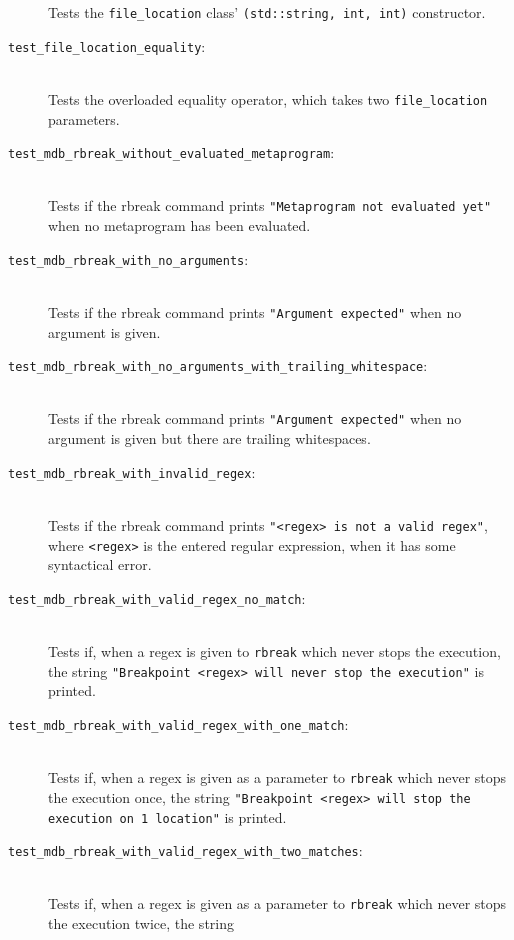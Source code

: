 \begin{description}
        Tests the \texttt{file\_location} class'
        \texttt{(std::string, int, int)} constructor.
    \item[\texttt{test\_file\_location\_equality}:] \hfill \\
        Tests the overloaded equality operator, which takes two
        \texttt{file\_location} parameters.
    \item[\texttt{test\_mdb\_rbreak\_without\_evaluated\_metaprogram}:] \hfill \\
        Tests if the rbreak command prints
        \texttt{"Metaprogram not evaluated yet"} when no metaprogram has been
        evaluated.
    \item[\texttt{test\_mdb\_rbreak\_with\_no\_arguments}:] \hfill \\
        Tests if the rbreak command prints
        \texttt{"Argument expected"} when no argument is given.
    \item[\texttt{test\_mdb\_rbreak\_with\_no\_arguments\_with\_trailing\_whitespace}:] \hfill \\
        Tests if the rbreak command prints
        \texttt{"Argument expected"} when no argument is given but there are
        trailing whitespaces.
    \item[\texttt{test\_mdb\_rbreak\_with\_invalid\_regex}:] \hfill \\
        Tests if the rbreak command prints
        \texttt{"<regex> is not a valid regex"}, where \texttt{<regex>} is the
        entered regular expression, when it has some syntactical error.
    \item[\texttt{test\_mdb\_rbreak\_with\_valid\_regex\_no\_match}:] \hfill \\
        Tests if, when a regex is given to \texttt{rbreak} which never stops
        the execution, the string
        \texttt{"Breakpoint <regex> will never stop the execution"} is
        printed.
    \item[\texttt{test\_mdb\_rbreak\_with\_valid\_regex\_with\_one\_match}:] \hfill \\
        Tests if, when a regex is given as a parameter to \texttt{rbreak} which
        never stops the execution once, the string
        \texttt{"Breakpoint <regex> will stop the execution on 1 location"} is
        printed.
    \item[\texttt{test\_mdb\_rbreak\_with\_valid\_regex\_with\_two\_matches}:] \hfill \\
        Tests if, when a regex is given as a parameter to \texttt{rbreak} which
        never stops the execution twice, the string

\end{description}
